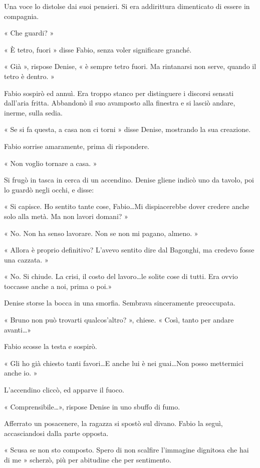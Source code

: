 Una voce lo distolse dai suoi pensieri. Si era addirittura dimenticato di essere in compagnia.

« Che guardi? »

« È tetro, fuori » disse Fabio, senza voler significare granché.

« Già », rispose Denise, « è sempre tetro fuori. Ma rintanarsi non serve, quando il tetro è dentro. »

Fabio sospirò ed annuì. Era troppo stanco per distinguere i discorsi sensati dall'aria fritta. Abbandonò il suo avamposto alla finestra e si lasciò andare, inerme, sulla sedia.

« Se si fa questa, a casa non ci torni » disse Denise, mostrando la sua creazione.

Fabio sorrise amaramente, prima di rispondere.

« Non voglio tornare a casa. »

Si frugò in tasca in cerca di un accendino. Denise gliene indicò uno da tavolo, poi lo guardò negli occhi, e disse:

« Si capisce. Ho sentito tante cose, Fabio\ldots Mi dispiacerebbe dover credere anche solo alla metà. Ma non lavori domani? »

« No. Non ha senso lavorare. Non se non mi pagano, almeno. »

« Allora è proprio definitivo? L'avevo sentito dire dal Bagonghi, ma credevo fosse una cazzata. »

« No. Si chiude. La crisi, il costo del lavoro\ldots le solite cose di tutti. Era ovvio toccasse anche a noi, prima o poi.»

Denise storse la bocca in una smorfia. Sembrava sinceramente preoccupata.

« Bruno non può trovarti qualcos'altro? », chiese. « Così, tanto per andare avanti\ldots »

Fabio scosse la testa e sospirò.

« Gli ho già chiesto tanti favori\ldots E anche lui è nei guai\ldots Non posso mettermici anche io. »

L'accendino cliccò, ed apparve il fuoco.

« Comprensibile\ldots », rispose Denise in uno sbuffo di fumo.

Afferrato un posacenere, la ragazza si spostò sul divano. Fabio la seguì, accasciandosi dalla parte opposta.

« Scusa se non sto composto. Spero di non scalfire l'immagine dignitosa che hai di me » scherzò, più per abitudine che per sentimento.

